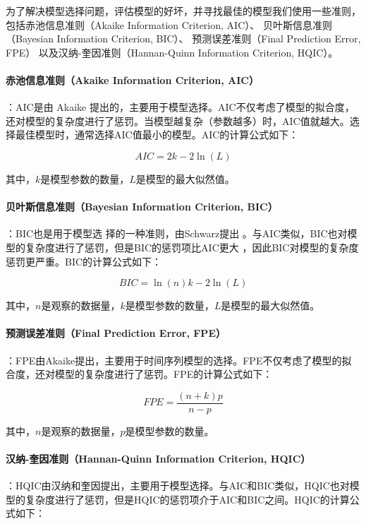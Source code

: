 \documentclass[a4paper,AutoFakeBold,oneside,12pt]{book}
\begin{document}
为了解决模型选择问题，评估模型的好坏，并寻找最佳的模型我们使用一些准则，
包括赤池信息准则（Akaike Information Criterion, AIC）、
贝叶斯信息准则（Bayesian Information Criterion, BIC）、
预测误差准则（Final Prediction Error, FPE）
以及汉纳-奎因准则（Hannan-Quinn Information Criterion, HQIC）。


\paragraph*{赤池信息准则（Akaike Information Criterion, AIC）}：AIC是由 Akaike 提出的\cite{akaike1981}，主要用于模型选择。AIC不仅考虑了模型的拟合度，还对模型的复杂度进行了惩罚。当模型越复杂（参数越多）时，AIC值就越大。选择最佳模型时，通常选择AIC值最小的模型。AIC的计算公式如下：

    \[ AIC = 2k - 2\ln(L) \]

    其中，$k$是模型参数的数量，$L$是模型的最大似然值。

\paragraph*{贝叶斯信息准则（Bayesian Information Criterion, BIC）}：BIC也是用于模型选
择的一种准则，由Schwarz提出 \cite{schwarz1978}。与AIC类似，BIC也对模型的复杂度进行了惩罚，但是BIC的惩罚项比AIC更大
，因此BIC对模型的复杂度惩罚更严重。BIC的计算公式如下：

    \[ BIC = \ln(n)k - 2\ln(L) \]

    其中，$n$是观察的数据量，$k$是模型参数的数量，$L$是模型的最大似然值。

\paragraph*{预测误差准则（Final Prediction Error, FPE）}：FPE由Akaike提出，主要用于时间序列模型的选择。FPE不仅考虑了模型的拟合度，还对模型的复杂度进行了惩罚\cite{8075977}。FPE的计算公式如下：

    \[ FPE = \frac{(n+k)p}{n-p} \]

    其中，$n$是观察的数据量，$p$是模型参数的数量。

\paragraph*{汉纳-奎因准则（Hannan-Quinn Information Criterion, HQIC）}：HQIC由汉纳和奎因提出，主要用于模型选择。与AIC和BIC类似，HQIC也对模型的复杂度进行了惩罚，但是HQIC的惩罚项介于AIC和BIC之间\cite{pollock1999}。HQIC的计算公式如下：
\end{document}
